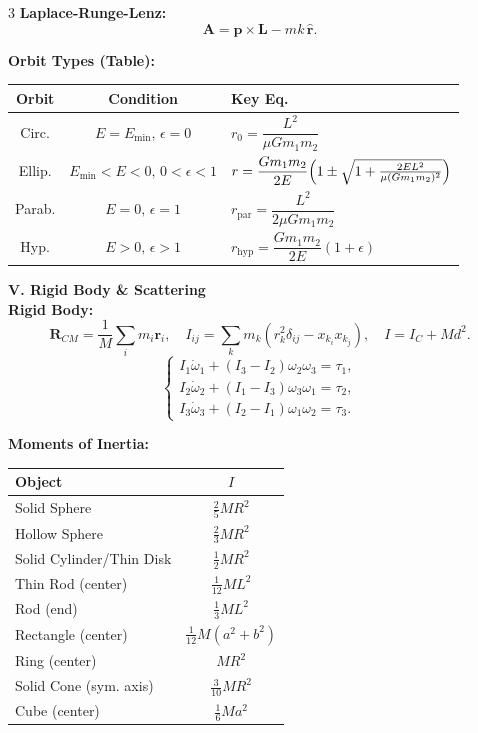 \documentclass[1pt]{article}
\begin{document}
\begin{multicols}{3}
\textbf{Laplace-Runge-Lenz:} 
\[
\mathbf{A}=\mathbf{p}\times\mathbf{L}-mk\,\hat{\mathbf{r}}.
\]

\textbf{Orbit Types (Table):}
\begin{center}
\begin{tabular}{c c l}
\toprule
Orbit & Condition & Key Eq.\\[2pt]
\midrule
Circ. & \(E=E_{\min},\,\epsilon=0\) & \(r_0=\dfrac{L^2}{\mu G m_1m_2}\)\\[4pt]
Ellip. & \(E_{\min}<E<0,\,0<\epsilon<1\) & \(r=\dfrac{Gm_1m_2}{2E}\Bigl(1\pm\sqrt{1+\frac{2EL^2}{\mu (Gm_1m_2)^2}}\Bigr)\)\\[4pt]
Parab. & \(E=0,\,\epsilon=1\) & \(r_{\text{par}}=\dfrac{L^2}{2\mu Gm_1m_2}\)\\[4pt]
Hyp. & \(E>0,\,\epsilon>1\) & \(r_{\text{hyp}}=\dfrac{Gm_1m_2}{2E}(1+\epsilon)\)\\
\bottomrule
\end{tabular}
\end{center}

\textbf{V. Rigid Body \& Scattering}\\[2pt]
\textbf{Rigid Body:} 
\[
\mathbf{R}_{CM}=\frac{1}{M}\sum_i m_i\mathbf{r}_i,
\quad I_{ij}=\sum_k m_k\left(r_k^2\delta_{ij}-x_{k_i}x_{k_j}\right),
\quad I=I_C+Md^2.
\]
\[
\begin{cases}
I_1\dot{\omega}_1+(I_3-I_2)\omega_2\omega_3=\tau_1,\\[2mm]
I_2\dot{\omega}_2+(I_1-I_3)\omega_3\omega_1=\tau_2,\\[2mm]
I_3\dot{\omega}_3+(I_2-I_1)\omega_1\omega_2=\tau_3.
\end{cases}
\]

\textbf{Moments of Inertia:}\\[2pt]
\renewcommand{\arraystretch}{1.1}
\begin{tabular}{l c}
\toprule
\textbf{Object} & \textbf{\(I\)} \\
\midrule
Solid Sphere & \(\frac{2}{5}MR^2\)\\[2mm]
Hollow Sphere & \(\frac{2}{3}MR^2\)\\[2mm]
Solid Cylinder/Thin Disk & \(\frac{1}{2}MR^2\)\\[2mm]
Thin Rod (center) & \(\frac{1}{12}ML^2\)\\[2mm]
Rod (end) & \(\frac{1}{3}ML^2\)\\[2mm]
Rectangle (center) & \(\frac{1}{12}M(a^2+b^2)\)\\[2mm]
Ring (center) & \(MR^2\)\\[2mm]
Solid Cone (sym. axis) & \(\frac{3}{10}MR^2\)\\[2mm]
Cube (center) & \(\frac{1}{6}Ma^2\)\\
\bottomrule
\end{tabular}


\end{multicols}
\end{document}
